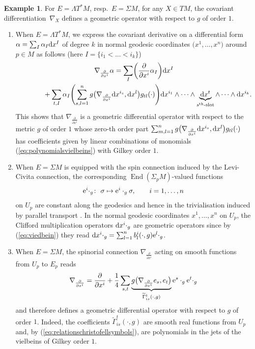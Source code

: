 \documentclass[pdftex]{sigma}
\numberwithin{equation}{section}
\theoremstyle{definition}
\newtheorem{ex}[thm]{Example}
\begin{document}
 \begin{ex}\label{ex:nablaXdiffgeom}
 For $E=\Lambda T^*M$, resp.\ $E=\Sigma M$, for any $X\in TM$,
 the covariant differentiation~$\nabla_X$ defines a geometric operator with respect to $g$ of order $1$.
 \begin{enumerate}\itemsep=0pt
\item When $E=\Lambda T^*M$, we express the covariant derivative on a differential form $\alpha=\sum_{I}\alpha_{I} {\rm d}x^I$ of degree $k$ in normal geodesic coordinates $\bigl(x^1, \dots, x^n\bigr)$ around $p\in M$ as follows (here $I=\{i_1<\dots<i_k\}$)
 	\begin{gather*}
 	 	\nabla_{\frac{\partial}{\partial x^i}}\alpha
= \sum_{I}\biggl({\frac{\partial}{\partial x^i}}\alpha_{I}\biggr) {\rm d}x^I\\
\hphantom{\nabla_{\frac{\partial}{\partial x^i}}\alpha =}{}
 + \sum_{t,I}\alpha_{I}\Biggl(\sum_{s,l=1}^n g\bigl(\nabla_{\frac{\partial}{\partial x^i}} {\rm d}x^{i_s},{\rm d}x^l\bigr)g_{tl}(\cdot)\Biggr) {\rm d}x^{i_1}\wedge\dots\wedge \underbrace{{\rm d}x^t}_{s^{\rm th}\text{{\rm -slot}}}\wedge\dots\wedge {\rm d}x^{i_k}.
 	\end{gather*}
This shows that $\nabla_{\frac{\partial}{\partial x^i}}$ is a geometric differential operator with respect to the metric $g$ of order $1$ whose zero-th order part $\sum_{m,l=1}^n g\bigl(\nabla_{\frac{\partial}{\partial x^i}} {\rm d}x^{i_s},{\rm d}x^l\bigr)g_{tl}(\cdot)$ has coefficients given by linear combinations of monomials (\ref{eq:polynomialsvielbeins}) with Gilkey order $1$.
 \item When $E=\Sigma M$ is equipped with the spin connection induced by the Levi-Civita connection, the corresponding $\operatorname{End}(\Sigma_p M)$-valued functions
\[{\rm e}^i \cdot_g\colon \ \sigma \mapsto {\rm e}^i \cdot_g \sigma,\qquad i=1, \dots, n\]
on $U_p$ are constant along the geodesics and hence in the trivialisation induced by parallel transport \cite[Lemma 4.14]{BGV}. In the normal geodesic coordinates $x^1, \dots, x^n$ on $U_p$, the Clifford multiplication operators ${\rm d}x^i \cdot_g$ are geometric operators since by (\ref{eq:viedbein}) they read
 $ {\rm d}x^i 	\cdot_g =\sum_{l=1}^n b_l^i(\cdot, g) {\rm e}^l \cdot_g $.

\item When $E=\Sigma M$, the spinorial connection $\nabla_{\frac{\partial}{\partial x^i}}$ acting on smooth functions from $U_p$ to $E_p$ reads
\begin{equation}\label{eq:connspin}
\nabla_{\frac{\partial}{\partial x^i}} =\frac{\partial}{\partial x^i} +\frac{1}{4}\sum_{s,t}\underbrace{g\bigl(\nabla_{\frac{\partial}{\partial x^i}} e_s,e_t\bigr)}_{\widetilde\Gamma_{i s }^t(\cdot,g)} {\rm e}^s\cdot_g {\rm e}^t\cdot_g
\end{equation}
and therefore defines a geometric differential operator with respect to $g$ of order $1$. Indeed, the coefficients $\widetilde\Gamma_{i s}^t(\cdot,g)$ are smooth real functions from $U_p$ and, by (\ref{eq:relationschristofellsymbols}), are polynomials in the jets of the vielbeins of Gilkey order $1$.
\end{enumerate}
\end{ex}
\end{document}
